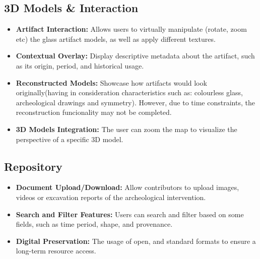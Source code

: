 \subsection*{\gls{3D} Models \& Interaction}
\begin{itemize}
    \item \textbf{Artifact Interaction:} Allows users to virtually manipulate (rotate, zoom etc) the glass artifact models, as well as apply different textures.
    \item \textbf{Contextual Overlay:} Display descriptive metadata about the artifact, such as its origin, period, and historical usage.
    \item \textbf{Reconstructed Models:} Showcase how artifacts would look originally(having in consideration characteristics such as: colourless glass, archeological drawings and symmetry). However, due to time constraints, the reconstruction funcionality may not be completed.
    \item \textbf{3D Models Integration:} The user can zoom the map to visualize the perspective of a specific \gls{3D} model.
\end{itemize}

\subsection*{Repository}
\begin{itemize}
    \item \textbf{Document Upload/Download:} Allow contributors to upload images, videos or excavation reports of the archeological intervention.
    \item \textbf{Search and Filter Features:} Users can search and filter based on some fields, such as time period, shape, and provenance.
    \item \textbf{Digital Preservation:} The usage of open, and standard formats to ensure a long-term resource access.
\end{itemize}


